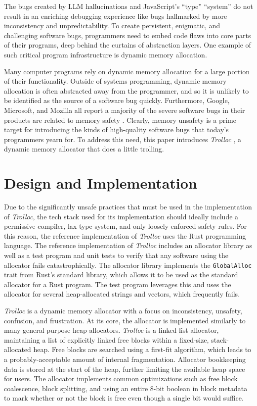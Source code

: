 \documentclass{article}
\begin{document}
The bugs created by LLM hallucinations and JavaScript's ``type'' ``system'' do not result in an enriching debugging experience like bugs hallmarked by more inconsistency and unpredictability. To create persistent, enigmatic, and challenging software bugs, programmers need to embed code flaws into core parts of their programs, deep behind the curtains of abstraction layers. One example of such critical program infrastructure is dynamic memory allocation.

Many computer programs rely on dynamic memory allocation for a large portion of their functionality. Outside of systems programming, dynamic memory allocation is often abstracted away from the programmer, and so it is unlikely to be identified as the source of a software bug quickly. Furthermore, Google, Microsoft, and Mozilla all report a majority of the severe software bugs in their products are related to memory safety \cite{lord}. Clearly, memory unsafety is a prime target for introducing the kinds of high-quality software bugs that today's programmers yearn for. To address this need, this paper introduces \textit{Trolloc} \cite{trolloc}, a dynamic memory allocator that does a little trolling.

\section{Design and Implementation}
Due to the significantly unsafe practices that must be used in the implementation of \textit{Trolloc}, the tech stack used for its implementation should ideally include a permissive compiler, lax type system, and only loosely enforced safety rules. For this reason, the reference implementation of \textit{Trolloc} uses the Rust programming language. The reference implementation of \textit{Trolloc} includes an allocator library as well as a test program and unit tests to verify that any software using the allocator fails catastrophically. The allocator library implements the \texttt{GlobalAlloc} trait \cite{globalalloc} from Rust's standard library, which allows it to be used as the standard allocator for a Rust program. The test program leverages this and uses the allocator for several heap-allocated strings and vectors, which frequently fails. 

\textit{Trolloc} is a dynamic memory allocator with a focus on inconsistency, unsafety, confusion, and frustration. At its core, the allocator is implemented similarly to many general-purpose heap allocators. \textit{Trolloc} is a linked list allocator, maintaining a list of explicitly linked free blocks within a fixed-size, stack-allocated heap. Free blocks are searched using a first-fit algorithm, which leads to a probably-acceptable amount of internal fragmentation. Allocator bookkeeping data is stored at the start of the heap, further limiting the available heap space for users. The allocator implements common optimizations such as free block coalescence, block splitting, and using an entire 8-bit boolean in block metadata to mark whether or not the block is free even though a single bit would suffice.
\end{document}
